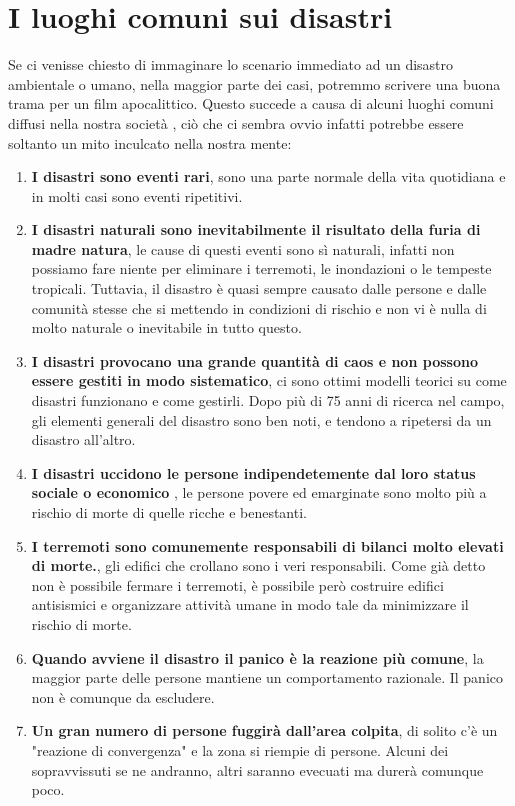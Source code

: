 \section{I luoghi comuni sui disastri}
\label{comuni}
Se ci venisse chiesto di immaginare lo scenario immediato ad un disastro ambientale o umano, nella maggior parte dei casi, potremmo scrivere una buona trama per un film apocalittico. Questo succede a causa di alcuni luoghi comuni diffusi nella nostra società \cite{COMMON}, ciò che ci sembra ovvio infatti potrebbe essere soltanto un mito inculcato nella nostra mente:
\begin{enumerate}
\item\textbf{ I disastri sono eventi rari}, sono una parte normale della vita quotidiana e in molti casi sono eventi ripetitivi.
\item\textbf{ I disastri naturali sono inevitabilmente il risultato della furia di madre natura}, le cause di questi eventi sono sì naturali, infatti non possiamo fare niente per eliminare i terremoti, le inondazioni o le tempeste tropicali. Tuttavia, il disastro è quasi sempre causato dalle persone e dalle comunità stesse che si mettendo in condizioni di rischio e non vi è nulla di molto naturale o inevitabile in tutto questo. 
\item\textbf{ I disastri provocano una grande quantità di caos e non possono essere gestiti in modo sistematico}, ci sono ottimi modelli teorici su come disastri funzionano e come gestirli. Dopo più di 75 anni di ricerca nel campo, gli elementi generali del disastro sono ben noti, e tendono a ripetersi da un disastro all'altro.
\item\textbf{ I disastri uccidono le persone indipendetemente dal loro status sociale o economico }, le persone povere ed emarginate sono molto più a rischio di morte di quelle ricche e benestanti.
\item\textbf{ I terremoti sono comunemente responsabili di bilanci molto elevati di morte.}, gli edifici che crollano sono i veri responsabili. Come già detto non è possibile fermare i terremoti, è possibile però costruire edifici antisismici e organizzare attività umane in modo tale da minimizzare il rischio di morte.
\item\textbf{Quando avviene il disastro il panico è la reazione più comune}, la maggior parte delle persone mantiene un comportamento razionale. Il panico non è comunque da escludere.
\item\textbf{Un gran numero di persone fuggirà dall'area colpita}, di solito c'è un "reazione di convergenza" e la zona si riempie di persone. Alcuni dei sopravvissuti se ne andranno, altri saranno evecuati ma durerà comunque poco.

\end{enumerate}

